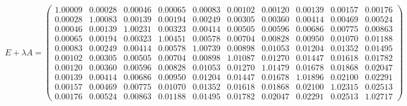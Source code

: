 \documentclass[a4paper, 12pt]{extarticle}
\begin{document}
\begin{equation}
    E + \lambda A = \begin{pmatrix}
        1.00009 & 0.00028 & 0.00046 & 0.00065 & 0.00083 & 0.00102 & 0.00120 & 0.00139 & 0.00157 & 0.00176 \\ 
        0.00028 & 1.00083 & 0.00139 & 0.00194 & 0.00249 & 0.00305 & 0.00360 & 0.00414 & 0.00469 & 0.00524 \\ 
        0.00046 & 0.00139 & 1.00231 & 0.00323 & 0.00414 & 0.00505 & 0.00596 & 0.00686 & 0.00775 & 0.00863 \\ 
        0.00065 & 0.00194 & 0.00323 & 1.00451 & 0.00578 & 0.00704 & 0.00828 & 0.00950 & 0.01070 & 0.01188 \\ 
        0.00083 & 0.00249 & 0.00414 & 0.00578 & 1.00739 & 0.00898 & 0.01053 & 0.01204 & 0.01352 & 0.01495 \\ 
        0.00102 & 0.00305 & 0.00505 & 0.00704 & 0.00898 & 1.01087 & 0.01270 & 0.01447 & 0.01618 & 0.01782 \\ 
        0.00120 & 0.00360 & 0.00596 & 0.00828 & 0.01053 & 0.01270 & 1.01479 & 0.01678 & 0.01868 & 0.02047 \\ 
        0.00139 & 0.00414 & 0.00686 & 0.00950 & 0.01204 & 0.01447 & 0.01678 & 1.01896 & 0.02100 & 0.02291 \\ 
        0.00157 & 0.00469 & 0.00775 & 0.01070 & 0.01352 & 0.01618 & 0.01868 & 0.02100 & 1.02315 & 0.02513 \\ 
        0.00176 & 0.00524 & 0.00863 & 0.01188 & 0.01495 & 0.01782 & 0.02047 & 0.02291 & 0.02513 & 1.02717 
    \end{pmatrix}
\end{equation}

\newcommand\scalemath[2]{\scalebox{#1}{\mbox{\ensuremath{\displaystyle #2}}}}
\end{document}
